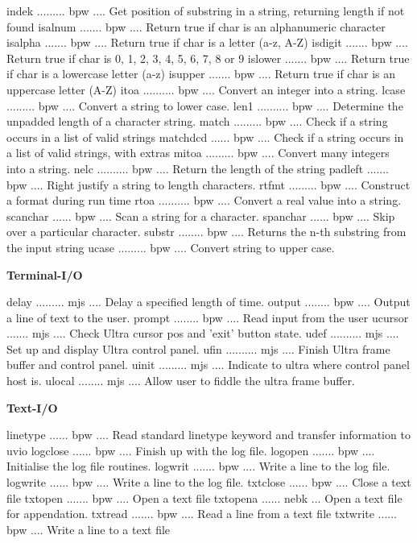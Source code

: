 {\eightpoint\begintt
indek ......... bpw .... Get position of substring in a string, returning length if not found
isalnum ....... bpw .... Return true if char is an alphanumeric character
isalpha ....... bpw .... Return true if char is a letter (a-z, A-Z)
isdigit ....... bpw .... Return true if char is 0, 1, 2, 3, 4, 5, 6, 7, 8 or 9
islower ....... bpw .... Return true if char is a lowercase letter (a-z)
\endtt}
{\eightpoint\begintt
isupper ....... bpw .... Return true if char is an uppercase letter (A-Z)
itoa .......... bpw .... Convert an integer into a string.
lcase ......... bpw .... Convert a string to lower case.
len1 .......... bpw .... Determine the unpadded length of a character string.
match ......... bpw .... Check if a string occurs in a list of valid strings
\endtt}
{\eightpoint\begintt
matchdcd ...... bpw .... Check if a string occurs in a list of valid strings, with extras
mitoa ......... bpw .... Convert many integers into a string.
nelc .......... bpw .... Return the length of the string
padleft ....... bpw .... Right justify a string to length characters.
rtfmt ......... bpw .... Construct a format during run time
\endtt}
{\eightpoint\begintt
rtoa .......... bpw .... Convert a real value into a string.
scanchar ...... bpw .... Scan a string for a character.
spanchar ...... bpw .... Skip over a particular character.
substr ........ bpw .... Returns the n-th substring from the input string
ucase ......... bpw .... Convert string to upper case.
\endtt}
\par\centerline{\bf Terminal-I/O}
{\eightpoint\begintt
delay ......... mjs .... Delay a specified length of time.
output ........ bpw .... Output a line of text to the user.
prompt ........ bpw .... Read input from the user
ucursor ....... mjs .... Check Ultra cursor pos and 'exit' button state.
udef .......... mjs .... Set up and display Ultra control panel.
\endtt}
{\eightpoint\begintt
ufin .......... mjs .... Finish Ultra frame buffer and control panel.
uinit ......... mjs .... Indicate to ultra where control panel host is.
ulocal ........ mjs .... Allow user to fiddle the ultra frame buffer.
\endtt}
\par\centerline{\bf Text-I/O}
{\eightpoint\begintt
linetype ...... bpw .... Read standard linetype keyword and transfer information to uvio
logclose ...... bpw .... Finish up with the log file.
logopen ....... bpw .... Initialise the log file routines.
logwrit ....... bpw .... Write a line to the log file.
logwrite ...... bpw .... Write a line to the log file.
\endtt}
{\eightpoint\begintt
txtclose ...... bpw .... Close a text file
txtopen ....... bpw .... Open a text file
txtopena ...... nebk ... Open a text file for appendation.
txtread ....... bpw .... Read a line from a text file
txtwrite ...... bpw .... Write a line to a text file
\endtt}
